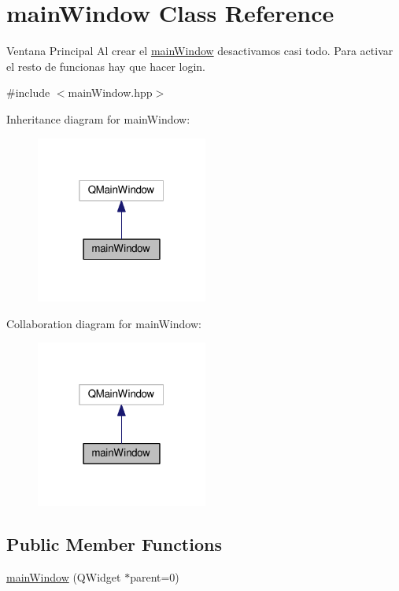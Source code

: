 \hypertarget{classmainWindow}{}\section{main\+Window Class Reference}
\label{classmainWindow}


Ventana Principal Al crear el \hyperlink{classmainWindow}{main\+Window} desactivamos casi todo. Para activar el resto de funcionas hay que hacer login.  




{\ttfamily \#include $<$main\+Window.\+hpp$>$}



Inheritance diagram for main\+Window\+:
\nopagebreak
\begin{figure}[H]
\begin{center}
\leavevmode
\includegraphics[width=160pt]{classmainWindow__inherit__graph}
\end{center}
\end{figure}


Collaboration diagram for main\+Window\+:
\nopagebreak
\begin{figure}[H]
\begin{center}
\leavevmode
\includegraphics[width=160pt]{classmainWindow__coll__graph}
\end{center}
\end{figure}
\subsection*{Public Member Functions}
\begin{DoxyCompactItemize}
\item 
\hyperlink{classmainWindow_a2c09a8baf94af0cc5109fcf2ef97b12a}{main\+Window} (Q\+Widget $\ast$parent=0)
\end{DoxyCompactItemize}


